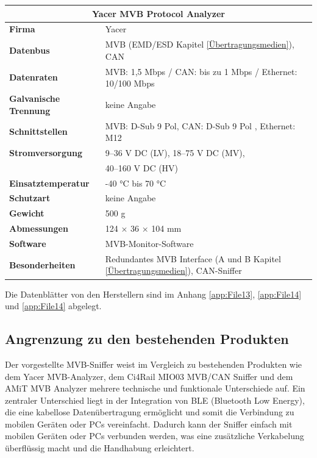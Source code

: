\hfill
\begin{minipage}{0.57\textwidth}
  \begin{tabular}{|m{3.3cm}|m{4.2cm}|}
    \hline
    \multicolumn{2}{|c|}{\textbf{Yacer MVB Protocol Analyzer}} \\ \hline
    \textbf{Firma} & Yacer \\ \hline
    \textbf{Datenbus} & MVB (EMD/ESD Kapitel \ref{Übertragungsmedien}), CAN \\ \hline
    \textbf{Datenraten} & MVB: 1,5 Mbps / CAN: bis zu 1 Mbps / Ethernet: 10/100 Mbps \\ \hline
    \textbf{Galvanische \mbox{Trennung}} & keine Angabe \\ \hline
    \textbf{Schnittstellen} & MVB: D-Sub 9 Pol, CAN: D-Sub 9 Pol , Ethernet: M12 \\ \hline
    \textbf{Stromversorgung} & 9–36 V DC (LV), 18–75 V DC (MV), \\ 
                                & 40–160 V DC (HV) \\ \hline
    \textbf{Einsatztemperatur} & -40 °C bis 70 °C \\ \hline
    \textbf{Schutzart} & keine Angabe \\ \hline
    \textbf{Gewicht} & 500 g \\ \hline
    \textbf{Abmessungen} & 124 × 36 × 104 mm \\ \hline
    \textbf{Software} & MVB-Monitor-Software \\ \hline
    \textbf{Besonderheiten} & Redundantes MVB Interface (A und B Kapitel \ref{Übertragungsmedien}), CAN-Sniffer \\ \hline
  \end{tabular}
\end{minipage}

Die Datenblätter von den Herstellern sind im Anhang \ref{app:File13}, \ref{app:File14} und \ref{app:File14} abgelegt.


\subsection{Angrenzung zu den bestehenden Produkten}

Der vorgestellte MVB-Sniffer weist im Vergleich zu bestehenden Produkten wie dem Yacer MVB-Analyzer, dem Ci4Rail MIO03 MVB/CAN Sniffer und dem AMiT MVB Analyzer mehrere technische und funktionale Unterschiede auf. Ein zentraler Unterschied liegt in der Integration von BLE (Bluetooth Low Energy), die eine kabellose Datenübertragung ermöglicht und somit die Verbindung zu mobilen Geräten oder PCs vereinfacht. Dadurch kann der Sniffer einfach mit mobilen Geräten oder PCs verbunden werden, was eine zusätzliche Verkabelung überflüssig macht und die Handhabung erleichtert.

